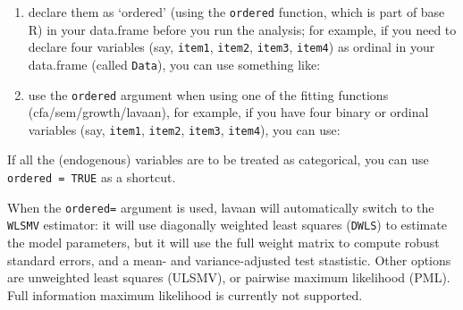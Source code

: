 \begin{enumerate}
\def\labelenumi{\arabic{enumi}.}
\item
  declare them as `ordered' (using the \texttt{ordered} function, which
  is part of base R) in your data.frame before you run the analysis; for
  example, if you need to declare four variables (say, \texttt{item1},
  \texttt{item2}, \texttt{item3}, \texttt{item4}) as ordinal in your
  data.frame (called \texttt{Data}), you can use something like:

\begin{Shaded}
\begin{Highlighting}[]
\NormalTok{Data[,}\NormalTok{(}\NormalTok{,}
        \NormalTok{,}
        \NormalTok{,}
        \NormalTok{)] }\OtherTok{\textless{}{-}}
    \NormalTok{(Data[,}\NormalTok{(}\NormalTok{,}
                   \NormalTok{,}
                   \NormalTok{,}
                   \NormalTok{)], ordered)}
\end{Highlighting}
\end{Shaded}
\item
  use the \texttt{ordered} argument when using one of the fitting
  functions (cfa/sem/growth/lavaan), for example, if you have four
  binary or ordinal variables (say, \texttt{item1}, \texttt{item2},
  \texttt{item3}, \texttt{item4}), you can use:

\begin{Shaded}
\begin{Highlighting}[]
\OtherTok{\textless{}{-}} 
            \NormalTok{(}\NormalTok{,}\NormalTok{,}
                       \NormalTok{,}\NormalTok{))}
\end{Highlighting}
\end{Shaded}
\end{enumerate}

If all the (endogenous) variables are to be treated as categorical, you
can use \texttt{ordered\ =\ TRUE} as a shortcut.

When the \texttt{ordered=} argument is used, lavaan will automatically
switch to the \texttt{WLSMV} estimator: it will use diagonally weighted
least squares (\texttt{DWLS}) to estimate the model parameters, but it
will use the full weight matrix to compute robust standard errors, and a
mean- and variance-adjusted test stastistic. Other options are
unweighted least squares (ULSMV), or pairwise maximum likelihood (PML).
Full information maximum likelihood is currently not supported.
